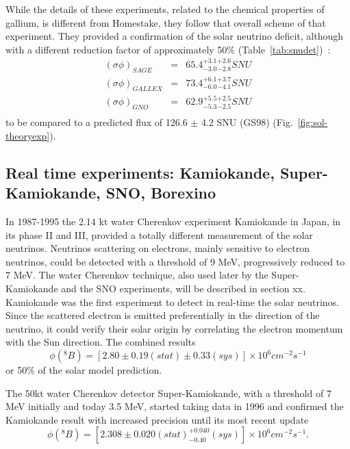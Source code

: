 While the details of these experiments, related to the chemical properties of gallium, is different from Homestake, they follow that overall scheme of that experiment. They provided a confirmation of the solar neutrino deficit, although with a different reduction factor of approximately 50\% (Table~\ref{tab:snudet})~\cite{abdurashitov,hampel,altmann,kaether}:
\begin{eqnarray}
(\sigma \phi)_{SAGE} & = & 65.4^{+3.1} _{-3.0} ^{+2.6} _{-2.8}  SNU \\
(\sigma \phi)_{GALLEX} & = & 73.4  ^{+6.1}_{-6.0} ^{+3.7} _{-4.1} SNU \\
(\sigma \phi)_{GNO} & = & 62.9  ^{+5.5} _{-5.3} ^{+2.5} _{-2.5} SNU \\
\end{eqnarray}
to be compared to a predicted flux of 126.6 $\pm$ 4.2 SNU (GS98) (Fig.~\ref{fig:sol-theoryexp}).


\subsection{Real time experiments: Kamiokande, Super-Kamiokande, SNO, Borexino}

In 1987-1995 the 2.14 kt water Cherenkov experiment Kamiokande in Japan, in its phase II and III, provided a totally different measurement of the solar neutrinos. Neutrinos scattering on electrons, mainly sensitive to electron neutrinos, could be detected with a threshold of 9 MeV, progressively reduced to 7 MeV.  
The water Cherenkov technique, also used later by the Super-Kamiokande and the SNO experiments, will be described in section xx.   
Kamiokande was the first experiment to detect in real-time the solar neutrinos. Since the scattered electron is emitted preferentially in the direction of the neutrino, it could verify their solar origin by correlating the electron momentum with the Sun direction. The combined results~\cite{fukuda}
\begin{equation}
\phi( ^8 B) = [2.80 \pm 0.19 (stat) \pm 0.33 (sys)] \times 10^6 cm^{−2} s^{−1}
\end{equation}
or 50\% of the solar model prediction.

The 50kt water Cherenkov detector Super-Kamiokande, with a threshold of 7 MeV initially and today 3.5 MeV, started taking data in 1996 and confirmed the Kamiokande result with increased precision until its most recent update~\cite{abesk4}
\begin{equation}
\phi( ^8 B) = [2.308 \pm 0.020 (stat) ^{+0.040}_{-0.40} (sys)] × 10^6 cm^{−2} s^{−1}.
\end{equation} 

